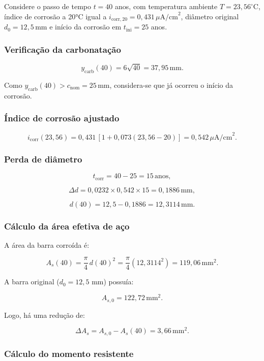 Considere o passo de tempo $t = 40$ anos, com temperatura ambiente $T = 23{,}56^\circ$C, índice de corrosão a 20°C igual a $i_{\mathrm{corr},20} = 0{,}431\,\mu\text{A/cm}^2$, diâmetro original $d_0 = 12{,}5\,\text{mm}$ e início da corrosão em $t_{\mathrm{ini}} = 25$ anos.

\subsubsection{Verificação da carbonatação}

\[
y_{\mathrm{carb}}(40) = 6\sqrt{40} = 37{,}95\,\text{mm}.
\]

Como $y_{\mathrm{carb}}(40) > c_{\mathrm{nom}} = 25\,\text{mm}$, considera-se que já ocorreu o início da corrosão.

\subsubsection{Índice de corrosão ajustado}

\[
i_{\mathrm{corr}}(23{,}56)
= 0{,}431 \, \left[ 1 + 0{,}073 (23{,}56 - 20) \right]
= 0{,}542\,\mu\text{A/cm}^2.
\]

\subsubsection{Perda de diâmetro}

\[
t_{\mathrm{corr}} = 40 - 25 = 15\,\text{anos},
\]

\[
\Delta d = 0{,}0232 \times 0{,}542 \times 15 = 0{,}1886\,\text{mm},
\]

\[
d(40) = 12{,}5 - 0{,}1886 = 12{,}3114\,\text{mm}.
\]

\subsubsection{Cálculo da área efetiva de aço}

A área da barra corroída é:

\[
A_s(40)
= \frac{\pi}{4}\,d(40)^2
= \frac{\pi}{4}(12{,}3114^2)
= 119{,}06\,\text{mm}^2.
\]

A barra original ($d_0 = 12{,}5$ mm) possuía:

\[
A_{s,0} = 122{,}72\,\text{mm}^2.
\]

Logo, há uma redução de:

\[
\Delta A_s = A_{s,0} - A_s(40) = 3{,}66\,\text{mm}^2.
\]

\subsubsection{Cálculo do momento resistente}

